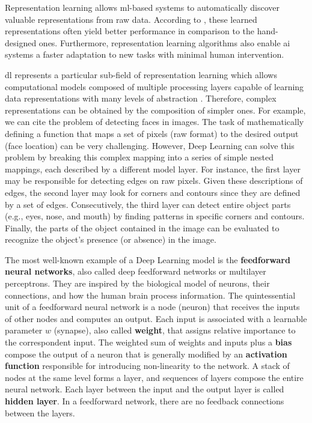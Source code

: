 Representation learning allows \acs{ml}-based systems to automatically discover valuable representations from raw data. According to \cite{goodfellow2016deep}, these learned representations often yield better performance in comparison to the hand-designed ones. Furthermore, representation learning algorithms also enable \acs{ai} systems a faster adaptation to new tasks with minimal human intervention.


\acf{dl} represents a particular sub-field of representation learning which allows computational models composed of multiple processing layers capable of learning data representations with many levels of abstraction \citep{lecun2015deep}. Therefore, complex representations can be obtained by the composition of simpler ones. For example, we can cite the problem of detecting faces in images. The task of mathematically defining a function that maps a set of pixels (raw format) to the desired output (face location) can be very challenging. However, Deep Learning can solve this problem by breaking this complex mapping into a series of simple nested mappings, each described by a different model layer. For instance, the first layer may be responsible for detecting edges on raw pixels. Given these descriptions of edges, the second layer may look for corners and contours since they are defined by a set of edges. Consecutively, the third layer can detect entire object parts (e.g., eyes, nose, and mouth) by finding patterns in specific corners and contours. Finally, the parts of the object contained in the image can be evaluated to recognize the object's presence (or absence) in the image.

The most well-known example of a Deep Learning model is the \textbf{feedforward neural networks}, also called deep feedforward networks or multilayer perceptrons.  They are inspired by the biological model of neurons, their connections, and how the human brain process information. The quintessential unit of a feedforward neural network is a node (neuron) that receives the inputs of other nodes and computes an output. Each input is associated with a learnable parameter $w$ (synapse), also called \textbf{weight}, that assigns relative importance to the correspondent input. The weighted sum of weights and inputs plus a \textbf{bias} compose the output of a neuron that is generally modified by an \textbf{activation function} responsible for introducing non-linearity to the network. A stack of nodes at the same level forms a layer, and sequences of layers compose the entire neural network. Each layer between the input and the output layer is called \textbf{hidden layer}. In a feedforward network, there are no feedback connections between the layers.

